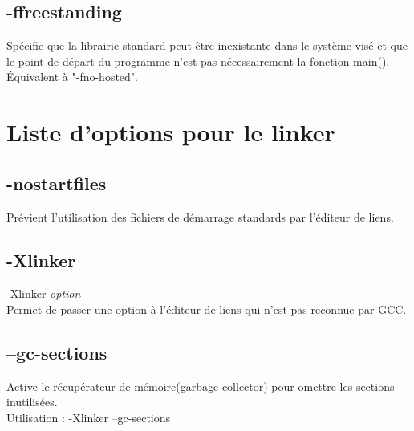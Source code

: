 \documentclass[headings=appendixprefix]{scrreprt}
\begin{document}

\section{-ffreestanding}

Spécifie que la librairie standard peut être inexistante dans le système visé et que le point de départ du programme n'est pas nécessairement la fonction main(). Équivalent à "-fno-hosted".\\


\chapter{Liste d'options pour le linker}
\setcounter{secnumdepth}{0}


\section{-nostartfiles}\label{nostartfiles}

Prévient l'utilisation des fichiers de démarrage standards par l'éditeur de liens.\\


\section{-Xlinker}

-Xlinker \textit{option}\\
Permet de passer une option à l'éditeur de liens qui n'est pas reconnue par GCC.\\


\section{--gc-sections}

Active le récupérateur de mémoire(garbage collector) pour omettre les sections inutilisées.\\

Utilisation : -Xlinker --gc-sections\\
\end{document}
